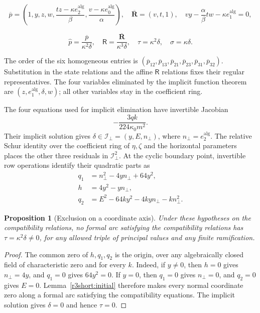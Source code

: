 \documentclass[11pt,a4paper]{article}
\numberwithin{equation}{section}
\theoremstyle{plain}
\newtheorem{proposition}[theorem]{Proposition}
\theoremstyle{definition}
\theoremstyle{remark}
\begin{document}
\begin{equation}\overline p=\left(1,y,z,w,\frac{tz-\kappa e_2^{\mathrm{alg}}}{\beta},\frac{v-\kappa e_0^{\mathrm{alg}}}{\alpha}\right),\quad\overline{\boldsymbol R}=(v,t,1),\quad vy-\frac\alpha\beta tw-\kappa e_1^{\mathrm{alg}}=0,\end{equation}

\begin{equation}\widehat p=\frac{\overline p}{\kappa^2\delta},\quad \mathsf R=\frac{\overline{\boldsymbol R}}{\kappa^3\delta},\quad\tau=\kappa^2\delta,\quad\sigma=\kappa\delta.\end{equation}

The order of the six homogeneous entries is
$(\overline p_{12},\overline p_{13},\overline p_{21},\overline p_{23},\overline p_{31},\overline p_{32})$.
Substitution in the state relations and the affine $\mathsf R$ relations
fixes their regular representatives. The four variables eliminated by the implicit function theorem are
$(z,e_1^{\mathrm{alg}},\delta,w)$; all other variables stay in the coefficient ring.

The four
equations used for implicit elimination have invertible Jacobian
\[
 -\frac{3qk}{224\kappa_0 m^2}.
\]
Their implicit solution gives $\delta\in \mathcal I_\perp=(y,E,n_\perp)$, where $n_\perp=e_2^{\mathrm{alg}}$.
The relative Schur identity over the coefficient ring of $\eta ,\zeta $
and the horizontal parameters places the other three residuals in
$\mathcal I_\perp^2$. At the cyclic boundary point, invertible row operations identify
their quadratic parts as
\begin{align*}
 q_1&=n_\perp^2-4yn_\perp+64y^2,\\
 h&=4y^2-yn_\perp,\\
 q_2&=E^2-64ky^2-4kyn_\perp-kn_\perp^2.
\end{align*}

\begin{proposition}[Exclusion on a coordinate axis]\label{r3short:pure-axis}
Under these hypotheses on the compatibility relations, no formal arc satisfying the compatibility relations has
$\tau=\kappa^2\delta\ne0$, for any allowed triple of principal values and any finite
ramification.
\end{proposition}
\begin{proof}
The common zero of $h,q_1,q_2$ is the origin, over any algebraically
closed field of characteristic zero and for every $k$. Indeed, if
$y\ne0$, then $h=0$ gives $n_\perp=4y$, and $q_1=0$ gives $64y^2=0$.
If $y=0$, then $q_1=0$ gives $n_\perp=0$, and $q_2=0$ gives $E=0$.
Lemma~\ref{r3short:initial} therefore makes every normal coordinate
zero along a formal arc satisfying the compatibility equations. The implicit solution gives $\delta=0$ and
hence $\tau=0$.
\end{proof}
\end{document}
